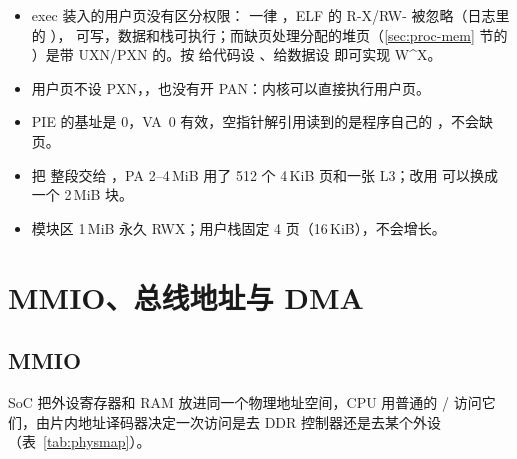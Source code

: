 \begin{itemize}
  \item exec 装入的用户页没有区分权限： 一律 ，ELF 的 R-X/RW- 被忽略（日志里的 ）， 可写，数据和栈可执行；而缺页处理分配的堆页（\ref{sec:proc-mem} 节的 ）是带 UXN/PXN 的。按  给代码设 、给数据设  即可实现 W\^{}X。
  \item 用户页不设 PXN，，也没有开 PAN：内核可以直接执行用户页。
  \item PIE 的基址是 0，VA~0 有效，空指针解引用读到的是程序自己的 ，不会缺页。
  \item {} 把 \code{[etext, EARLYTOP)} 整段交给 ，PA 2--4\,MiB 用了 512 个 4\,KiB 页和一张 L3；改用  可以换成一个 2\,MiB 块。
  \item 模块区 1\,MiB 永久 RWX；用户栈固定 4 页（16\,KiB），不会增长。
\end{itemize}

\section{MMIO、总线地址与 DMA}

\subsection{MMIO}

SoC 把外设寄存器和 RAM 放进同一个物理地址空间，CPU 用普通的 / 访问它们，由片内地址译码器决定一次访问是去 DDR 控制器还是去某个外设（表~\ref{tab:physmap}）。

